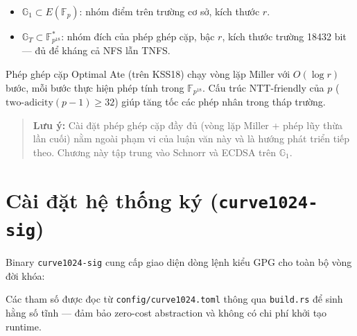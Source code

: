 \begin{itemize}
\tightlist
\item
  \textbf{\(\mathbb{G}_1 \subset E(\mathbb{F}_p)\)}: nhóm điểm trên
  trường cơ sở, kích thước \(r\).
\item
  \textbf{\(\mathbb{G}_T \subset \mathbb{F}_{p^{18}}^*\)}: nhóm đích của
  phép ghép cặp, bậc \(r\), kích thước trường 18432 bit --- đủ để kháng
  cả NFS lẫn TNFS.
\end{itemize}

Phép ghép cặp Optimal Ate (trên KSS18) chạy vòng lặp Miller với
\(O(\log r)\) bước, mỗi bước thực hiện phép tính trong
\(\mathbb{F}_{p^{18}}\). Cấu trúc NTT-friendly của \(p\)
(\(\text{two-adicity}(p-1) \geq 32\)) giúp tăng tốc các phép nhân trong
tháp trường.

\begin{quote}
\textbf{Lưu ý:} Cài đặt phép ghép cặp đầy đủ (vòng lặp Miller + phép lũy
thừa lần cuối) nằm ngoài phạm vi của luận văn này và là hướng phát triển
tiếp theo. Chương này tập trung vào Schnorr và ECDSA trên
\(\mathbb{G}_1\).
\end{quote}

\section{\texorpdfstring{Cài đặt hệ thống ký
(\texttt{curve1024-sig})}{Cài đặt hệ thống ký (curve1024-sig)}}\label{cuxe0i-ux111ux1eb7t-hux1ec7-thux1ed1ng-kuxfd-curve1024-sig}

Binary \texttt{curve1024-sig} cung cấp giao diện dòng lệnh kiểu GPG cho
toàn bộ vòng đời khóa:

\begin{Shaded}
\begin{Highlighting}[]
\NormalTok{ keygen [{-}o }\OperatorTok{\textless{}}\OperatorTok{\textgreater{}}\NormalTok{]}
 \OperatorTok{\textless{}}\OperatorTok{\textgreater{}}\NormalTok{ [{-}k }\OperatorTok{\textless{}}\OperatorTok{\textgreater{}}\NormalTok{] [{-}{-}scheme schnorr}\KeywordTok{|}\ExtensionTok{ecdsa]}
 \OperatorTok{\textless{}}\OperatorTok{\textgreater{}}\NormalTok{ [{-}k }\OperatorTok{\textless{}}\OperatorTok{\textgreater{}}\NormalTok{]}
\NormalTok{ export{-}pub [{-}k }\OperatorTok{\textless{}}\OperatorTok{\textgreater{}}\NormalTok{] [{-}o }\OperatorTok{\textless{}}\OperatorTok{\textgreater{}}\NormalTok{]}
\end{Highlighting}
\end{Shaded}

\label{lst:ch4_cli}\vspace{12pt}

Các tham số được đọc từ \texttt{config/curve1024.toml} thông qua
\texttt{build.rs} để sinh hằng số tĩnh --- đảm bảo zero-cost abstraction
và không có chi phí khởi tạo runtime.

\FloatBarrier
